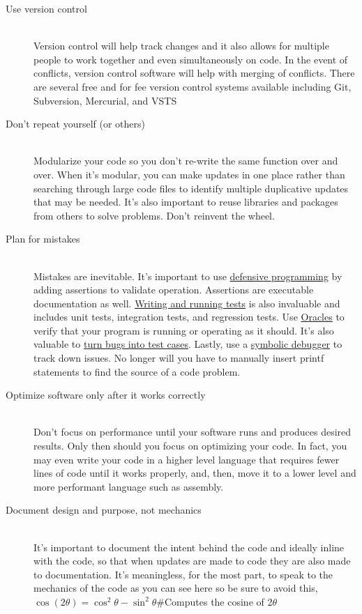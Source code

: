 \documentclass[12pt,a4paper,oneside,draft]{article}
\begin{document}
\begin{description}
   \item[Use version control] \hfill \\
   Version control will help track changes and it also allows for multiple people to work together and even simultaneously on code. In the event of conflicts, version control software will help with merging of conflicts. There are several free and for fee version control systems available including Git, Subversion, Mercurial, and VSTS  
   
   \item[Don't repeat yourself (or others)] \hfill \\
   Modularize your code so you don't re-write the same function over and over. When it's modular, you can make updates in one place rather than searching through large code files to identify multiple duplicative updates that may be needed. It's also important to reuse libraries and packages from others to solve problems. Don't reinvent the wheel.
      
   \item[Plan for mistakes] \hfill \\
   Mistakes are inevitable. It's important to use \underline{defensive programming} by adding assertions to validate operation. Assertions are executable documentation as well. \underline{Writing and running tests} is also invaluable and includes unit tests, integration tests, and regression tests. Use \underline{Oracles} to verify that your program is running or operating as it should. It's also valuable to \underline{turn bugs into test cases}. Lastly, use a \underline{symbolic debugger} to track down issues. No longer will you have to manually insert printf statements to find the source of a code problem.
      
   \item[Optimize software only after it works correctly] \hfill \\
   Don't focus on performance until your software runs and produces desired results. Only then should you focus on optimizing your code. In fact, you may even write your code in a higher level language that requires fewer lines of code until it works properly, and, then, move it to a lower level and more performant language such as assembly.
      
   \item[Document design and purpose, not mechanics] \hfill \\
   It's important to document the intent behind the code and ideally inline with the code, so that when updates are made to code they are also made to documentation. It's meaningless, for the most part, to speak to the mechanics of the code as you can see here so be sure to avoid this,
   \newline
   \newline
   $\cos (2\theta) = \cos^2 \theta - \sin^2 \theta$\hspace{16mm}$\#$Computes the cosine of 2$\theta$
      

\end{description}
\end{document}
